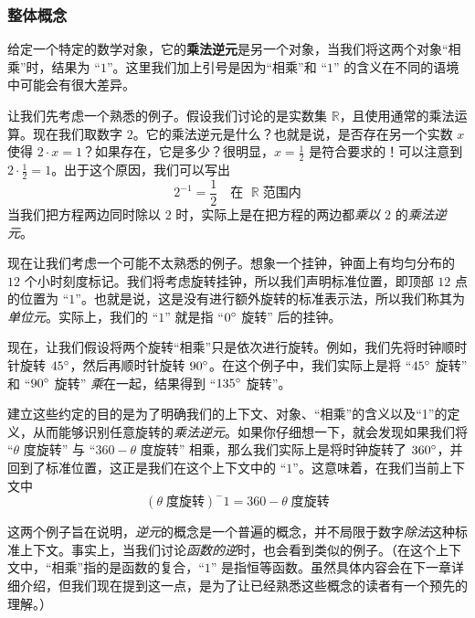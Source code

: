 \subsubsection*{整体概念}

给定一个特定的数学对象，它的\textbf{乘法逆元}是另一个对象，当我们将这两个对象``相乘''时，结果为 ``$1$''。这里我们加上引号是因为``相乘''和 ``$1$'' 的含义在不同的语境中可能会有很大差异。\\

\begin{example}
    让我们先考虑一个熟悉的例子。假设我们讨论的是实数集 $\mathbb{R}$，且使用通常的乘法运算。现在我们取数字 $2$。它的乘法逆元是什么？也就是说，是否存在另一个实数 $x$ 使得 $2 \cdot x = 1$？如果存在，它是多少？很明显，$x = \frac{1}{2}$ 是符合要求的！可以注意到 $2 \cdot \frac{1}{2} = 1$。出于这个原因，我们可以写出
    \[2^{-1} = \frac{1}{2} \quad \text{在 }\; \mathbb{R} \;\text{范围内}\]
    当我们把方程两边同时除以 $2$ 时，实际上是在把方程的两边都\emph{乘以} $2$ 的\emph{乘法逆元}。
\end{example}

\begin{example}
    现在让我们考虑一个可能不太熟悉的例子。想象一个挂钟，钟面上有均匀分布的 $12$ 个小时刻度标记。我们将考虑旋转挂钟，所以我们声明标准位置，即顶部 $12$ 点的位置为 ``$1$''。也就是说，这是没有进行额外旋转的标准表示法，所以我们称其为\emph{单位元}。实际上，我们的 ``$1$'' 就是指 ``$0 ^\circ$ 旋转'' 后的挂钟。

    现在，让我们假设将两个旋转``相乘''只是依次进行旋转。例如，我们先将时钟顺时针旋转 $45 ^\circ$，然后再顺时针旋转 $90 ^\circ$。在这个例子中，我们实际上是将 ``$45 ^\circ$ 旋转'' 和 ``$90 ^\circ$ 旋转'' \emph{乘}在一起，结果得到 ``$135 ^\circ$ 旋转''。

    建立这些约定的目的是为了明确我们的上下文、对象、``相乘''的含义以及``1''的定义，从而能够识别任意旋转的\emph{乘法逆元}。如果你仔细想一下，就会发现如果我们将 ``$\theta$ 度旋转'' 与 ``$360-\theta$ 度旋转'' 相乘，那么我们实际上是将时钟旋转了 $360 ^\circ$，并回到了标准位置，这正是我们在这个上下文中的 ``$1$''。这意味着，在我们当前上下文中
    \[(\theta \;\text{度旋转})^-1 = 360-\theta \;\text{度旋转}\]
\end{example}

这两个例子旨在说明，\emph{逆元}的概念是一个普遍的概念，并不局限于数字\emph{除法}这种标准上下文。事实上，当我们讨论\emph{函数的逆}时，也会看到类似的例子。（在这个上下文中，``相乘''指的是函数的复合，``$1$'' 是指恒等函数。虽然具体内容会在下一章详细介绍，但我们现在提到这一点，是为了让已经熟悉这些概念的读者有一个预先的理解。）

